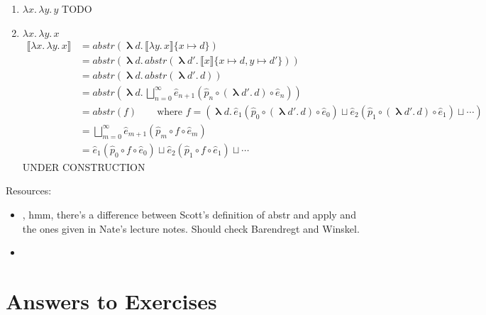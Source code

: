 \documentclass{tufte-handout}
\newcommand{\SEM}[1]{\llbracket #1 \rrbracket}
\newcommand{\LAM}[1]{\lambda #1.\,}
\newcommand{\MLAM}[1]{\boldsymbol\uplambda #1.\,}
\begin{document}
\begin{Answer}
\begin{enumerate}
  \item $\LAM{x}\LAM{y}y$ TODO


  \item $\LAM{x}\LAM{y}x$
    \begin{align*}
      \SEM{\LAM{x}\LAM{y}x} &= \mathit{abstr}(\MLAM{d} \SEM{\LAM{y}x}\{x\mapsto d\}) \\
      &= \mathit{abstr}(\MLAM{d} \mathit{abstr}(\MLAM{d'}\SEM{x}\{x\mapsto d,y\mapsto d'\})) \\
      &= \mathit{abstr}(\MLAM{d} \mathit{abstr}(\MLAM{d'}d)) \\
      &= \mathit{abstr}(\MLAM{d} \bigsqcup_{n=0}^\infty \hat{e}_{n+1}(\hat{p}_n \circ (\MLAM{d'}d) \circ \hat{e}_n)) \\
      &= \mathit{abstr}(f)  \qquad \text{where }
f = (\MLAM{d} \hat{e}_{1}(\hat{p}_0 \circ (\MLAM{d'}d) \circ \hat{e}_0)  \sqcup \hat{e}_{2}(\hat{p}_1 \circ (\MLAM{d'}d) \circ \hat{e}_1) \sqcup \cdots )\\
      &= \bigsqcup_{m=0}^\infty \hat{e}_{m+1}(\hat{p}_m \circ f \circ \hat{e}_m)\\
      &= \hat{e}_{1}(\hat{p}_0 \circ f \circ \hat{e}_0)
        \sqcup \hat{e}_{2}(\hat{p}_1 \circ f \circ \hat{e}_1)
        \sqcup \cdots
    \end{align*}
    UNDER CONSTRUCTION
    

  \end{enumerate}
\end{Answer}

Resources:
\begin{itemize}
\item \citet{Scott:1971aa}, hmm, there's a difference between
  Scott's definition of abstr and apply and the ones given
  in Nate's lecture notes. Should check Barendregt and Winskel.
\item \citet{Amadio:1998fk}
\end{itemize}

\clearpage
\pagebreak

\section*{Answers to Exercises}

\shipoutAnswer

\clearpage
\pagebreak



\end{document}
